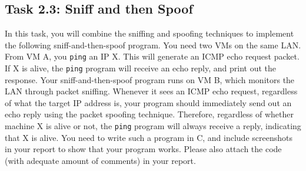 \begin{comment}
If you see error messages regarding the UDP (or TCP) header structure, add
the following statement right before \url{#include <netinet/udp.h>}
statement. You can find the reason by reading
the {\tt udp.h} header file in the \url{/usr/include/netinet} directory.
\begin{verbatim} 
  #define __FAVOR_BSD 
\end{verbatim} 


\paragraph{\myproblem}
Please use your own words to describe the sequence of the 
library calls that are essential for packet spoofing. This 
is meant to be a summary.

\end{comment}





\subsection{Task 2.3: Sniff and then Spoof}

In this task, you will combine the sniffing and spoofing techniques
to implement the following sniff-and-then-spoof program. 
You need two VMs on the same LAN. From VM A, you 
{\tt ping} an IP X. This will generate an ICMP echo 
request packet. If X is alive, the {\tt ping} program will receive 
an echo reply, and print out the response. Your sniff-and-then-spoof
program runs on VM B, which monitors the LAN through packet sniffing. Whenever it 
sees an ICMP echo request, regardless of what the target IP address is,
your program should immediately send out an echo reply using the 
packet spoofing technique. Therefore, regardless of whether machine X
is alive or not, the {\tt ping} program will always receive 
a reply, indicating that X is alive. You need to write such a program in C, and
include screenshots in your report to show that 
your program works. Please also attach the code (with adequate amount 
of comments) in your report.







